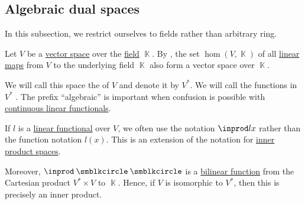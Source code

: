 \subsection{Algebraic dual spaces}\label{subsec:algebraic_dual_spaces}

In this subsection, we restrict ourselves to fields rather than arbitrary ring.

\begin{definition}\label{def:dual_vector_space}
  Let \( V \) be a \hyperref[def:vector_space]{vector space} over the \hyperref[def:field]{field} \( \BbbK \). By , the set \( \hom(V, \BbbK) \) of all \hyperref[def:semimodule/homomorphism]{linear maps} from \( V \) to the underlying field \( \BbbK \) also form a vector space over \( \BbbK \).

  We will call this space the  of \( V \) and denote it by \( V^* \). We will call the functions in \( V^* \) . The prefix \enquote{algebraic} is important when confusion is possible with \hyperref[def:continuous_dual_space]{continuous linear functionals}.
\end{definition}

\begin{remark}\label{rem:dual_space_bilinear_form}
  If \( l \) is a \hyperref[def:dual_vector_space]{linear functional} over \( V \), we often use the notation \( \inprod l x \) rather than the function notation \( l(x) \). This is an extension of the notation for \hyperref[def:inner_product_space]{inner product spaces}.

  Moreover, \( \inprod \anon \anon \) is a \hyperref[def:multilinear_function]{bilinear function} from the Cartesian product \( V^* \times V \) to \( \BbbK \). Hence, if \( V \) is isomorphic to \( V^* \), then this is precisely an inner product.
\end{remark}

